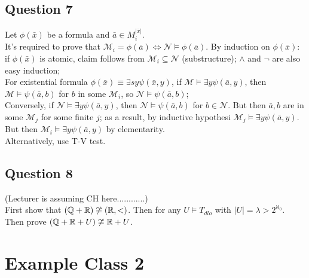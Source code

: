\documentclass[a4paper]{article}
\begin{document}
\subsection{Question 7}
Let $\phi(\bar{x})$ be a formula and $\bar{a} \in M_i^{|\bar{x}|}$.\\
It's required to prove that $\mathcal{M}_i = \phi(\bar{a}) \iff \mathcal{N} \vDash \phi(\bar{a})$. By induction on $\phi(\bar{x})$: if $\phi(\bar{x})$ is atomic, claim follows from $\mathcal{M}_i \subseteq \mathcal{N}$ (substructure); $\wedge$ and $\neg$ are also easy induction;\\
For existential formula $\phi(\bar{x}) \equiv \exists sy \psi(\bar{x},y)$, if $\mathcal{M} \vDash \exists y \psi(\bar{a},y)$, then $\mathcal{M} \vDash \psi(\bar{a},b)$ for $b$ in some $\mathcal{M}_i$, so $\mathcal{N} \vDash \psi(\bar{a},b)$;\\
Conversely, if $\mathcal{N} \vDash \exists y \psi(\bar{a},y)$, then $\mathcal{N} \vDash \psi(\bar{a},b)$ for $b \in \mathcal{N}$. But then $\bar{a},b$ are in some $\mathcal{M}_j$ for some finite $j$; as a result, by inductive hypothesi $\mathcal{M}_j \vDash \exists y \psi (\bar{a},y)$.\\
But then $\mathcal{M}_i \vDash \exists y \psi(\bar{a},y)$ by elementarity.\\
Alternatively, use T-V test.

\subsection{Question 8}
(Lecturer is assuming CH here............)\\
First show that $(\mathbb{Q}+\mathbb{R}) \not\cong (\mathbb{R},<)$. Then for any $U \vDash T_{dlo}$ with $|U| = \lambda > 2^{\aleph_0}$. Then prove $(\mathbb{Q}+\mathbb{R}+U) \not\cong \mathbb{R}+U$.

\newpage

\section{Example Class 2}
\end{document}
